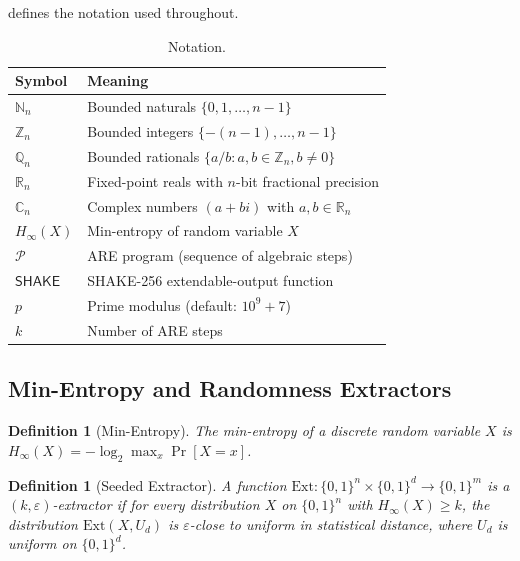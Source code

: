 \documentclass[11pt,a4paper]{article}
\newtheorem{definition}[theorem]{Definition}
\newcommand{\minentropy}{H_{\infty}}
\newcommand{\N}{\mathbb{N}}
\newcommand{\Z}{\mathbb{Z}}
\newcommand{\Q}{\mathbb{Q}}
\newcommand{\R}{\mathbb{R}}
\newcommand{\CC}{\mathbb{C}}
\begin{document}
 defines the notation used throughout.
\begin{table}[t]
  \centering
  \caption{Notation.}
  \label{tab:notation}
  \begin{tabular}{@{}ll@{}}
    \toprule
    Symbol & Meaning \\
    \midrule
    $\N_n$     & Bounded naturals $\{0, 1, \ldots, n-1\}$ \\
    $\Z_n$     & Bounded integers $\{-(n-1), \ldots, n-1\}$ \\
    $\Q_n$     & Bounded rationals $\{a/b : a,b \in \Z_n, b \neq 0\}$ \\
    $\R_n$     & Fixed-point reals with $n$-bit fractional precision \\
    $\CC_n$    & Complex numbers $(a + bi)$ with $a,b \in \R_n$ \\
    $\minentropy(X)$ & Min-entropy of random variable $X$ \\
    $\mathcal{P}$    & ARE program (sequence of algebraic steps) \\
    $\mathsf{SHAKE}$ & SHAKE-256 extendable-output function \\
    $p$              & Prime modulus (default: $10^9+7$) \\
    $k$              & Number of ARE steps \\
    \bottomrule
  \end{tabular}
\end{table}

\subsection{Min-Entropy and Randomness Extractors}
\label{sec:prelim:extractors}

\begin{definition}[Min-Entropy]
The min-entropy of a discrete random variable $X$ is
$\minentropy(X) = -\log_2 \max_x \Pr[X = x]$.
\end{definition}

\begin{definition}[Seeded Extractor]
A function $\mathrm{Ext}: \{0,1\}^n \times \{0,1\}^d \to \{0,1\}^m$
is a $(k, \varepsilon)$-extractor if for every distribution $X$ on
$\{0,1\}^n$ with $\minentropy(X) \geq k$, the distribution
$\mathrm{Ext}(X, U_d)$ is $\varepsilon$-close to uniform in
statistical distance, where $U_d$ is uniform on $\{0,1\}^d$.
\end{definition}
\end{document}
